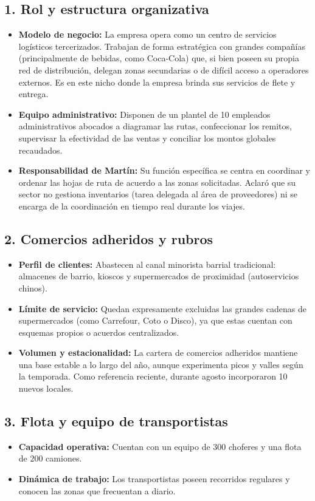 \documentclass[11pt,a4paper]{article}
\begin{document}
\subsection*{1. Rol y estructura organizativa}
\begin{itemize}
  \item \textbf{Modelo de negocio:} La empresa opera como un centro de servicios logísticos tercerizados. Trabajan de forma estratégica con grandes compañías (principalmente de bebidas, como Coca-Cola) que, si bien poseen su propia red de distribución, delegan zonas secundarias o de difícil acceso a operadores externos. Es en este nicho donde la empresa brinda sus servicios de flete y entrega.
  \item \textbf{Equipo administrativo:} Disponen de un plantel de 10 empleados administrativos abocados a diagramar las rutas, confeccionar los remitos, supervisar la efectividad de las ventas y conciliar los montos globales recaudados.
  \item \textbf{Responsabilidad de Martín:} Su función específica se centra en coordinar y ordenar las hojas de ruta de acuerdo a las zonas solicitadas. Aclaró que su sector no gestiona inventarios (tarea delegada al área de proveedores) ni se encarga de la coordinación en tiempo real durante los viajes.
\end{itemize}

\subsection*{2. Comercios adheridos y rubros}
\begin{itemize}
  \item \textbf{Perfil de clientes:} Abastecen al canal minorista barrial tradicional: almacenes de barrio, kioscos y supermercados de proximidad (autoservicios chinos).
  \item \textbf{Límite de servicio:} Quedan expresamente excluidas las grandes cadenas de supermercados (como Carrefour, Coto o Disco), ya que estas cuentan con esquemas propios o acuerdos centralizados.
  \item \textbf{Volumen y estacionalidad:} La cartera de comercios adheridos mantiene una base estable a lo largo del año, aunque experimenta picos y valles según la temporada. Como referencia reciente, durante agosto incorporaron 10 nuevos locales.
\end{itemize}

\subsection*{3. Flota y equipo de transportistas}
\begin{itemize}
  \item \textbf{Capacidad operativa:} Cuentan con un equipo de 300 choferes y una flota de 200 camiones.
  \item \textbf{Dinámica de trabajo:} Los transportistas poseen recorridos regulares y conocen las zonas que frecuentan a diario.
\end{itemize}
\end{document}
